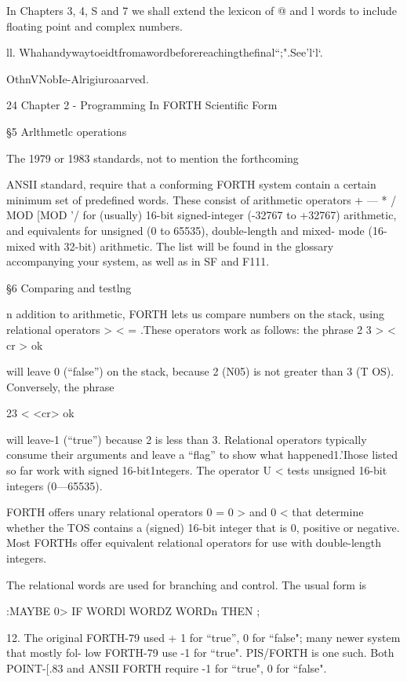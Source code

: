 In Chapters 3, 4, S and 7 we shall extend the lexicon of @ and l
words to include floating point and complex numbers.

 

ll. Whahandywaytoeidtfromawordbeforereachingtheﬁnal“;".See'l‘l‘.

OthnVNobIe-Alrigiuroaarved.

24 Chapter 2 - Programming In FORTH Scientiﬁc Form

§5 Arlthmetlc operations

The 1979 or 1983 standards, not to mention the forthcoming

ANSII standard, require that a conforming FORTH system
contain a certain minimum set of predefined words. These consist
of arithmetic operators + — * / MOD [MOD '/ for (usually)
16-bit signed-integer (-32767 to +32767) arithmetic, and
equivalents for unsigned (0 to 65535), double-length and mixed-
mode (16- mixed with 32-bit) arithmetic. The list will be found in
the glossary accompanying your system, as well as in SF and F111.

§6 Comparing and testlng

n addition to arithmetic, FORTH lets us compare numbers on
the stack, using relational operators > < = .These operators
work as follows: the phrase
2 3 > < cr > ok

will leave 0 (“false”) on the stack, because 2 (N05) is not greater
than 3 (T OS). Conversely, the phrase

23 < <cr> ok

will leave-1 (“true”) because 2 is less than 3. Relational operators
typically consume their arguments and leave a “ﬂag” to show what
happened1.'Ihose listed so far work with signed 16-bit1ntegers.
The operator U < tests unsigned 16-bit integers (0—65535).

FORTH offers unary relational operators 0 = 0 > and 0 < that
determine whether the TOS contains a (signed) 16-bit integer
that is 0, positive or negative. Most FORTHs offer equivalent
relational operators for use with double-length integers.

The relational words are used for branching and control. The
usual form is

:MAYBE 0> IF WORDl WORDZ
WORDn THEN ;

 

12. The original FORTH-79 used + 1 for “true”, 0 for “false"; many newer system that mostly fol-
low FORTH-79 use -1 for “true". PIS/FORTH is one such. Both POINT-[.83 and ANSII
FORTH require -1 for “true", 0 for “false".

